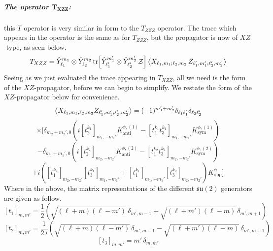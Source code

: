 \subparagraph[The operator $T_{XZZ}$]{The operator $\mathbf{T_{XZZ}}$:} this $T$ operator is very similar in form to the $T_{ZZZ}$ operator. The trace which appears in the operator is the same as for $T_{ZZZ}$, but the propagator is now of $XZ$-type, as seen below.
%
%
\begin{equation}
T_{XZZ} = \hat{Y}_{\ell_1}^{m_1} \otimes \hat{Y}_{\ell_2}^{m_2}
\tr[\hat{Y}_{\ell_1'}^{m_1'} \otimes \hat{Y}_{\ell_2'}^{m_2'} \, \mathcal{Z}]
\expval{X_{\ell_1, m_1; \ell_2, m_2} \, Z_{\ell_1', m_1'; \ell_2', m_2'}}
\end{equation}
%
%
Seeing as we just evaluated the trace appearing in $T_{XZZ}$, all we need is the form of the $XZ$-propagator, before we can begin to simplify. We restate the form of the $XZ$-propagator below for convenience.
%
%
\begin{equation*}
\expval{
X_{\ell_1,m_1;\ell_2,m_2}
Z_{\ell_1',m_1';\ell_2',m_2'}
}
=
(-1)^{m_1' + m_2'} \delta_{\ell_1 \ell_1'} \delta_{\ell_2 \ell_2'}
\end{equation*}
%
%
\begin{equation*}
\times
\Bigg[
\delta_{m_2 + m_2',0}
\left(
i [t_2^{k_1}]_{m_1,-m_1'} K^{\phi,(1)}_{\text{anti}}
- [t_1^{k_1} t_3^{k_1}]_{m_1,-m_1'} K^{\phi,(1)}_{\text{sym}}
\right)
\end{equation*}
%
%
\begin{equation*}
-
\delta_{m_1 + m_1',0}
\left(
i [t_2^{k_2}]_{m_2,-m_2'} K^{\phi,(2)}_{\text{anti}}
- [t_1^{k_2} t_3^{k_2}]_{m_2,-m_2'} K^{\phi,(2)}_{\text{sym}}
\right)
\end{equation*}
%
%
\begin{equation}\label{XZ-propagator}
+
i
\left(
[t_1^{k_2}]_{m_2,-m_2'} [t_3^{k_1}]_{m_1,-m_1'}
+
[t_1^{k_1}]_{m_1,-m_1'} [t_3^{k_2}]_{m_2,-m_2'}
\right)
K^{\phi}_{\text{opp}}
\Bigg]
\end{equation}
%
%
Where in the above, the matrix representations of the different $\mathfrak{su}(2)$ generators are given as follow.
%
%
\begin{equation}\label{t1-rep}
[t_1]_{m,m'} = \frac{1}{2} \left(
\sqrt{(\ell+m)(\ell-m')} \, \delta_{m',m-1}
+
\sqrt{(\ell+m')(\ell-m)} \, \delta_{m',m+1}
\right)
\end{equation}
%
%
\begin{equation}\label{t2-rep}
[t_2]_{m,m'} = \frac{1}{2 \, i} \left(
\sqrt{(\ell+m)(\ell-m')} \, \delta_{m',m-1}
-
\sqrt{(\ell+m')(\ell-m)} \, \delta_{m',m+1}
\right)
\end{equation}
%
%
\begin{equation}\label{t3-rep}
[t_3]_{m,m'} = m' \, \delta_{m,m'}
\end{equation}

